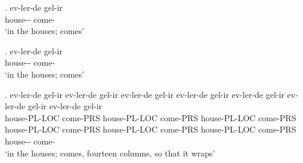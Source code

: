 
\GlossMorphAlign

{\GlossTransSide
\ex. \gll ev-ler-de gel-ir \\
          house-- come- \\
\glt `in the houses; comes'

}

\ex. \gll ev-ler-de\exannot{[NP]} gel-ir \\
          house-- come- \\
\glt `in the houses; comes'

\ex. \gll ev-ler-de gel-ir ev-ler-de gel-ir ev-ler-de gel-ir ev-ler-de
          gel-ir ev-ler-de gel-ir ev-ler-de gel-ir ev-ler-de gel-ir \\
          house-PL-LOC come-PRS house-PL-LOC come-PRS house-PL-LOC come-PRS
          house-PL-LOC come-PRS house-PL-LOC come-PRS house-PL-LOC come-PRS
          house-- come- \\
\glt `in the houses; comes, fourteen columns, so that it wraps'


